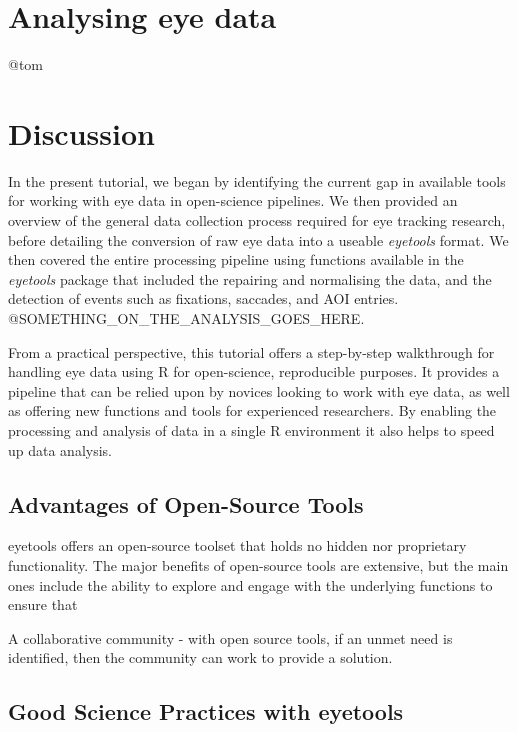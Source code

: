 \documentclass[
  man,
  floatsintext,
  longtable,
  nolmodern,
  notxfonts,
  notimes,
  colorlinks=true,linkcolor=blue,citecolor=blue,urlcolor=blue]{apa7}
\begin{document}
\section{Analysing eye data}\label{analysing-eye-data}

@tom

\section{Discussion}\label{discussion}

In the present tutorial, we began by identifying the current gap in
available tools for working with eye data in open-science pipelines. We
then provided an overview of the general data collection process
required for eye tracking research, before detailing the conversion of
raw eye data into a useable \emph{eyetools} format. We then covered the
entire processing pipeline using functions available in the
\emph{eyetools} package that included the repairing and normalising the
data, and the detection of events such as fixations, saccades, and AOI
entries. @SOMETHING\_ON\_THE\_ANALYSIS\_GOES\_HERE.

From a practical perspective, this tutorial offers a step-by-step
walkthrough for handling eye data using R for open-science, reproducible
purposes. It provides a pipeline that can be relied upon by novices
looking to work with eye data, as well as offering new functions and
tools for experienced researchers. By enabling the processing and
analysis of data in a single R environment it also helps to speed up
data analysis.

\subsection{Advantages of Open-Source
Tools}\label{advantages-of-open-source-tools}

eyetools offers an open-source toolset that holds no hidden nor
proprietary functionality. The major benefits of open-source tools are
extensive, but the main ones include the ability to explore and engage
with the underlying functions to ensure that

A collaborative community - with open source tools, if an unmet need is
identified, then the community can work to provide a solution.

\subsection{Good Science Practices with
eyetools}\label{good-science-practices-with-eyetools}
\end{document}

